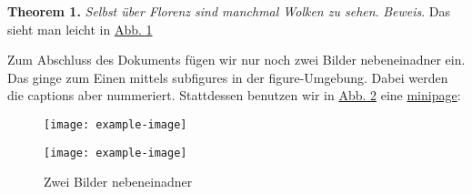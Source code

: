 \documentclass{scrartcl}
\begin{document}
\noindent \textbf{Theorem 1.} \textit{Selbst \"uber Florenz sind manchmal Wolken zu sehen}.
\newline \textit{Beweis}. Das sieht man leicht in \hyperref[abb1]{Abb. 1} 
\newline
\newline

Zum Abschluss des Dokuments f\"ugen wir nur noch zwei Bilder nebeneinadner ein. Das ginge zum Einen mittels subfigures in
der figure-Umgebung. Dabei werden die captions aber nummeriert. Stattdessen benutzen wir in \hyperref[abb2]{Abb. 2} eine
\href{https://www.namsu.de/Extra/befehle/Minipage.html}{minipage}:
\newline

\begin{figure}[h]
\begin{minipage}[c]{0.5\textwidth}
    \texttt{[image: example-image]}
\end{minipage}
\begin{minipage}[c]{0.5\textwidth}
    \texttt{[image: example-image]}
\end{minipage}

\caption{Zwei Bilder nebeneinadner}
\label{abb2}
\end{figure}

\listoftables

\listoffigures

\printbibliography
\end{document}
